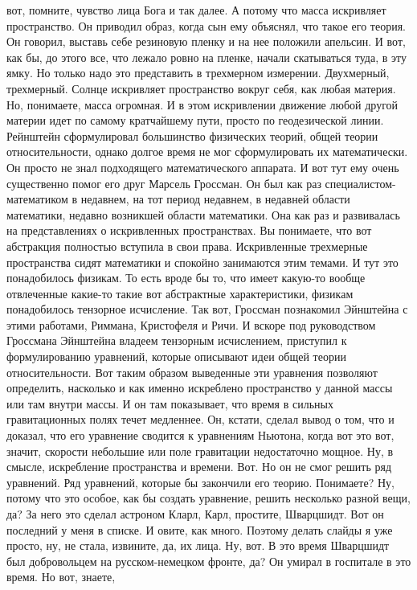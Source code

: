 вот, помните, чувство лица Бога и так далее. А потому что масса искривляет
пространство. Он приводил образ, когда сын ему объяснял, что такое его теория.
Он говорил, выставь себе резиновую пленку и на нее положили апельсин. И вот, как
бы, до этого все, что лежало ровно на пленке, начали скатываться туда, в эту
ямку. Но только надо это представить в трехмерном измерении. Двухмерный,
трехмерный. Солнце искривляет пространство вокруг себя, как любая материя. Но,
понимаете, масса огромная. И в этом искривлении движение любой другой материи
идет по самому кратчайшему пути, просто по геодезической линии. Рейнштейн
сформулировал большинство физических теорий, общей теории относительности,
однако долгое время не мог сформулировать их математически. Он просто не знал
подходящего математического аппарата. И вот тут ему очень существенно помог его
друг Марсель Гроссман. Он был как раз специалистом-математиком в недавнем, на
тот период недавнем, в недавней области математики, недавно возникшей области
математики. Она как раз и развивалась на представлениях о искривленных
пространствах. Вы понимаете, что вот абстракция полностью вступила в свои права.
Искривленные трехмерные пространства сидят математики и спокойно занимаются этим
темами. И тут это понадобилось физикам. То есть вроде бы то, что имеет какую-то
вообще отвлеченные какие-то такие вот абстрактные характеристики, физикам
понадобилось тензорное исчисление. Так вот, Гроссман познакомил Эйнштейна с
этими работами, Риммана, Кристофеля и Ричи. И вскоре под руководством Гроссмана
Эйнштейна владеем тензорным исчислением, приступил к формулированию уравнений,
которые описывают идеи общей теории относительности. Вот таким образом
выведенные эти уравнения позволяют определить, насколько и как именно искреблено
пространство у данной массы или там внутри массы. И он там показывает, что время
в сильных гравитационных полях течет медленнее. Он, кстати, сделал вывод о том,
что и доказал, что его уравнение сводится к уравнениям Ньютона, когда вот это
вот, значит, скорости небольшие или поле гравитации недостаточно мощное. Ну, в
смысле, искребление пространства и времени. Вот. Но он не смог решить ряд
уравнений. Ряд уравнений, которые бы закончили его теорию. Понимаете? Ну, потому
что это особое, как бы создать уравнение, решить несколько разной вещи, да? За
него это сделал астроном Кларл, Карл, простите, Шварцшидт. Вот он последний у
меня в списке. И овите, как много. Поэтому делать слайды я уже просто, ну, не
стала, извините, да, их лица. Ну, вот. В это время Шварцшидт был добровольцем на
русском-немецком фронте, да? Он умирал в госпитале в это время. Но вот, знаете,
